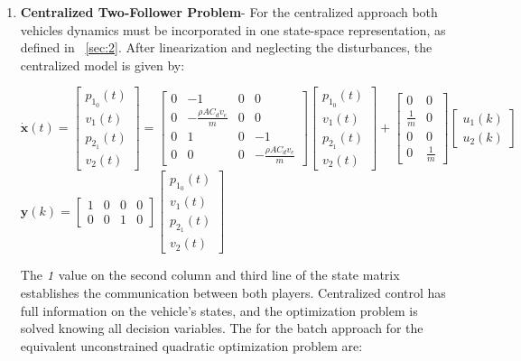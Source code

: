 \documentclass[a4paper,twocolumn]{article}
\newcommand{\bb}[1]{\mathbf{#1}}
\newcommand{\bvec}[1]{\bb{#1}}
\newcommand{\blkmat}[1]{\begin{bmatrix} #1 \end{bmatrix}}
\begin{document}
\begin{enumerate}[3.2]

    \item \textbf{Centralized Two-Follower Problem}- For the centralized approach both vehicles dynamics must be incorporated in one  state-space representation, as defined in ~\ref{sec:2}. After linearization and neglecting the disturbances, the centralized model is given by: 
    
    $\bvec{\Dot{x}}(t)=\blkmat{p_1_0(t) \\ v_1(t) \\ p_2_1(t) \\ v_2(t)}=    
	\begin{bmatrix}
    0 & -1 & 0 & 0\\
    0 &-\frac{\rho A C_d v_e}{m} & 0 & 0\\
    0 & 1 & 0 & -1\\
    0 & 0 & 0 & -\frac{\rho A C_d v_e}{m}
    \end{bmatrix}
    \blkmat{p_1_0(t) \\ v_1(t) \\ p_2_1(t) \\ v_2(t)}+
    \begin{bmatrix}
    0 & 0\\
    \frac{1}{m} & 0\\
    0 & 0\\
    0 & \frac{1}{m}
    \end{bmatrix}
    \begin{bmatrix}
    u_1(k)\\
    u_2(k)
    \end{bmatrix}$
    \newline
    $\bvec{y}(k)=
    \begin{bmatrix}
    1 & 0 & 0 & 0\\
    0 & 0 & 1 & 0
    \end{bmatrix}
    \blkmat{p_1_0(t) \\ v_1(t) \\ p_2_1(t) \\ v_2(t)}$
    
    The $\emph{1}$ value on the second column and third line of the state matrix establishes the communication between both players.
    Centralized control has full information on the vehicle's states, and the optimization problem is solved knowing all decision variables.\cite{Ding2012}\newline
    The for the batch approach for the equivalent unconstrained quadratic optimization problem are:


\end{enumerate}
\end{document}

